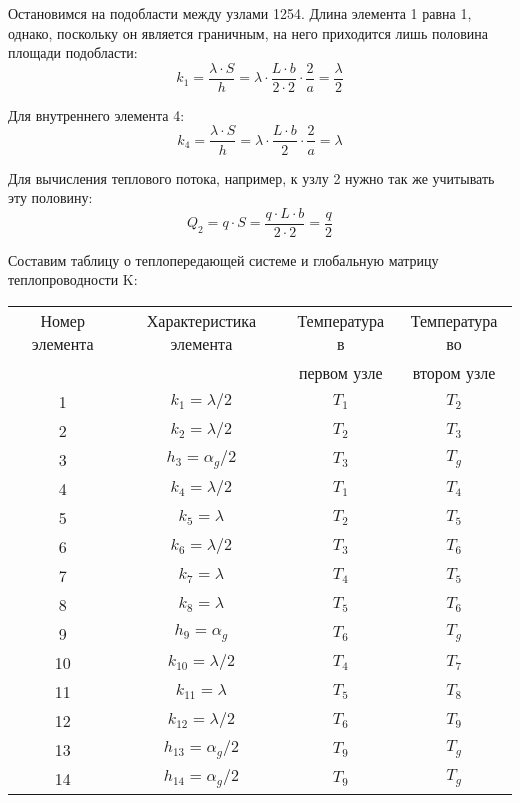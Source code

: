 \documentclass[a4paper, 12pt]{article}
\begin{document}
Остановимся на подобласти между узлами 1254. Длина элемента 1 равна 1, однако, поскольку он является граничным, на него приходится лишь половина площади подобласти:
\[k_1 = \frac{\lambda \cdot S}{h} = \lambda \cdot \frac{L \cdot b}{2\cdot2} \cdot \frac{2}{a} = \frac{\lambda}{2}\]

Для внутреннего элемента 4:
\[k_4 = \frac{\lambda \cdot S}{h} = \lambda \cdot \frac{L \cdot b}{2} \cdot \frac{2}{a} = \lambda\]

Для вычисления теплового потока, например, к узлу 2 нужно так же учитывать эту половину:
\[Q_2 = q \cdot S = \frac{q \cdot L \cdot b}{2 \cdot 2} = \frac{q}{2}\]

Составим таблицу о теплопередающей системе и глобальную матрицу теплопроводности K:
\begin{table}[h]
    \centering
    \begin{tabular}{|c|c|c|c|}
        \toprule
        Номер элемента & Характеристика элемента & Температура в & Температура во \\ 
        & & первом узле & втором узле\\ 
        \midrule
        1 & $k_1 = \lambda/2$ & $T_1$ & $T_2$\\
         \midrule
        2 & $k_2 = \lambda/2$ & $T_2$ & $T_3$\\
         \midrule
        3 & $h_3 = \alpha_g/2$ & $T_3$ & $T_g$\\
        \midrule
        4 & $k_4 = \lambda/2$ & $T_1$ & $T_4$\\
        \midrule
        5 & $k_5 = \lambda$ & $T_2$ & $T_5$\\
        \midrule
        6 & $k_6 = \lambda/2$ & $T_3$ & $T_6$\\
        \midrule
        7 & $k_7 = \lambda$ & $T_4$ & $T_5$\\
        \midrule
        8 & $k_8 = \lambda$ & $T_5$ & $T_6$\\
        \midrule
        9 & $h_9 = \alpha_g$ & $T_6$ & $T_g$\\
        \midrule
        10 & $k_{10} = \lambda/2$ & $T_4$ & $T_7$\\
        \midrule
        11 & $k_{11} = \lambda$ & $T_5$ & $T_8$\\
        \midrule
        12 & $k_{12} = \lambda/2$ & $T_6$ & $T_9$\\
        \midrule
        13 & $h_{13} = \alpha_g/2$ & $T_9$ & $T_g$\\
        \midrule
        14 & $h_{14} = \alpha_g/2$ & $T_9$ & $T_g$\\

\end{tabular}
\end{table}
\end{document}
